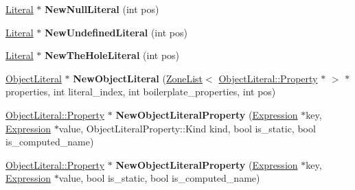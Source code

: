 \begin{DoxyCompactItemize}
\item 
\hyperlink{classv8_1_1internal_1_1_literal}{Literal} $\ast$ {\bfseries New\+Null\+Literal} (int pos)\hypertarget{classv8_1_1internal_1_1_b_a_s_e___e_m_b_e_d_d_e_d_a80be6b44661b719b0c7376076fdc32df}{}\label{classv8_1_1internal_1_1_b_a_s_e___e_m_b_e_d_d_e_d_a80be6b44661b719b0c7376076fdc32df}

\item 
\hyperlink{classv8_1_1internal_1_1_literal}{Literal} $\ast$ {\bfseries New\+Undefined\+Literal} (int pos)\hypertarget{classv8_1_1internal_1_1_b_a_s_e___e_m_b_e_d_d_e_d_a816c43936ba0266ed0d97366f76e436d}{}\label{classv8_1_1internal_1_1_b_a_s_e___e_m_b_e_d_d_e_d_a816c43936ba0266ed0d97366f76e436d}

\item 
\hyperlink{classv8_1_1internal_1_1_literal}{Literal} $\ast$ {\bfseries New\+The\+Hole\+Literal} (int pos)\hypertarget{classv8_1_1internal_1_1_b_a_s_e___e_m_b_e_d_d_e_d_afc7ddb99c10dd97693ebcf8a1e8ddda5}{}\label{classv8_1_1internal_1_1_b_a_s_e___e_m_b_e_d_d_e_d_afc7ddb99c10dd97693ebcf8a1e8ddda5}

\item 
\hyperlink{classv8_1_1internal_1_1_object_literal}{Object\+Literal} $\ast$ {\bfseries New\+Object\+Literal} (\hyperlink{classv8_1_1internal_1_1_zone_list}{Zone\+List}$<$ \hyperlink{classv8_1_1internal_1_1_object_literal_property}{Object\+Literal\+::\+Property} $\ast$ $>$ $\ast$properties, int literal\+\_\+index, int boilerplate\+\_\+properties, int pos)\hypertarget{classv8_1_1internal_1_1_b_a_s_e___e_m_b_e_d_d_e_d_afa61780c7bef1d062a707322302430f5}{}\label{classv8_1_1internal_1_1_b_a_s_e___e_m_b_e_d_d_e_d_afa61780c7bef1d062a707322302430f5}

\item 
\hyperlink{classv8_1_1internal_1_1_object_literal_property}{Object\+Literal\+::\+Property} $\ast$ {\bfseries New\+Object\+Literal\+Property} (\hyperlink{classv8_1_1internal_1_1_expression}{Expression} $\ast$key, \hyperlink{classv8_1_1internal_1_1_expression}{Expression} $\ast$value, Object\+Literal\+Property\+::\+Kind kind, bool is\+\_\+static, bool is\+\_\+computed\+\_\+name)\hypertarget{classv8_1_1internal_1_1_b_a_s_e___e_m_b_e_d_d_e_d_a8607aabc0103e41ec61a368b2fdde5ea}{}\label{classv8_1_1internal_1_1_b_a_s_e___e_m_b_e_d_d_e_d_a8607aabc0103e41ec61a368b2fdde5ea}

\item 
\hyperlink{classv8_1_1internal_1_1_object_literal_property}{Object\+Literal\+::\+Property} $\ast$ {\bfseries New\+Object\+Literal\+Property} (\hyperlink{classv8_1_1internal_1_1_expression}{Expression} $\ast$key, \hyperlink{classv8_1_1internal_1_1_expression}{Expression} $\ast$value, bool is\+\_\+static, bool is\+\_\+computed\+\_\+name)\hypertarget{classv8_1_1internal_1_1_b_a_s_e___e_m_b_e_d_d_e_d_a8c8c50c09a56bbf339d2f7e60e683f9b}{}\label{classv8_1_1internal_1_1_b_a_s_e___e_m_b_e_d_d_e_d_a8c8c50c09a56bbf339d2f7e60e683f9b}


\end{DoxyCompactItemize}
